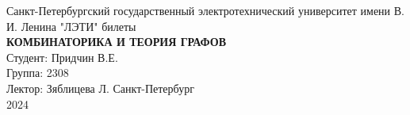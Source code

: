 \documentclass[
	openany,
	10pt,
	parindent=0
] {article}
\theoremstyle{custom}
\newcommand*{\titleASU}{\begingroup
	\begin{center}
        \large
		Санкт-Петербургский государственный электротехнический университет
		имени В. И. Ленина "ЛЭТИ"
		\vfill
		билеты \\ 
		\huge{\textbf{КОМБИНАТОРИКА И ТЕОРИЯ ГРАФОВ}} \\
        \vspace*{200pt}
        \large
        Студент: \hfill Придчин В.Е.\\
        Группа: \hfill 2308 \\
        Лектор: \hfill Зяблицева Л.
		\vfill
		Санкт-Петербург \\ 2024
		\newpage
	\end{center}
\endgroup}
\begin{document}
    \begin{titlepage}
        \titleASU
    \end{titlepage}

    \setcounter{page}{2}

    
	
	
	
	
\end{document}
